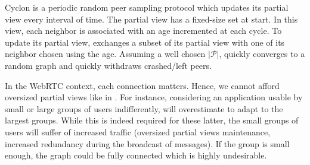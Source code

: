 \begin{asparadesc}
\item [Cyclon]\cite{voulgaris2005cyclon} is a periodic random peer sampling
  protocol which updates its partial view every interval of time. The partial
  view has a fixed-size set at start. In this view, each neighbor is
  associated with an age incremented at each cycle. To update its partial view,
  \CYCLON{} exchanges a subset of its partial view with one of its neighbor
  chosen using the age.  Assuming a well chosen $|\mathcal{P}|$, \CYCLON{}
  quickly converges to a random graph and quickly withdraws crashed/left peers.

  In the WebRTC context, each connection matters. Hence, we cannot afford
  oversized partial views like in \CYCLON{}. For instance, considering an
  application usable by small or large groups of users indifferently, \CYCLON{}
  will overestimate to adapt to the largest groups. While this is indeed
  required for these latter, the small groups of users will suffer of increased
  traffic (oversized partial views maintenance, increased redundancy during the
  broadcast of messages). If the group is small enough, the graph could be
  fully connected which is highly undesirable.
\end{asparadesc}

